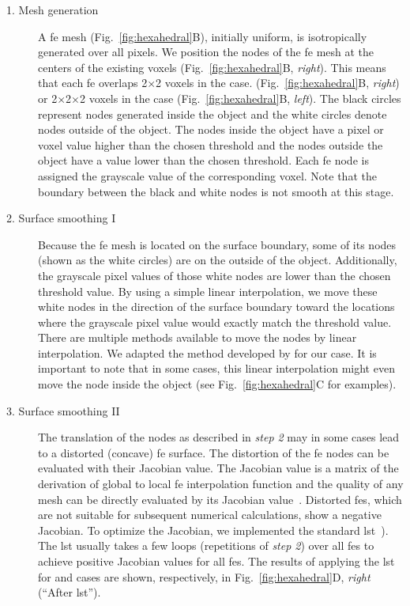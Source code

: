 \begin{description}
	\item[1. Mesh generation] A \ac{fe} mesh (Fig.~\ref{fig:hexahedral}B), initially uniform, is isotropically generated over all pixels. We position the nodes of the \ac{fe} mesh at the centers of the existing voxels (Fig.~\ref{fig:hexahedral}B, \textit{right}). This means that each \ac{fe} overlaps 2$\times$2 voxels in the \twod case. (Fig.~\ref{fig:hexahedral}B, \textit{right}) or 2$\times$2$\times$2 voxels in the \threed case (Fig.~\ref{fig:hexahedral}B, \textit{left}). The black circles represent nodes generated inside the object and the white circles denote nodes outside of the object. The nodes inside the object have a pixel or voxel value higher than the chosen threshold and the nodes outside the object have a value lower than the chosen threshold. Each \ac{fe} node is assigned the grayscale value of the corresponding voxel. Note that the boundary between the black and white nodes is not smooth at this stage.
	\item[2. Surface smoothing I] Because the \ac{fe} mesh is located on the surface boundary, some of its nodes (shown as the white circles) are on the outside of the object. Additionally, the grayscale pixel values of those white nodes are lower than the chosen threshold value. By using a simple linear interpolation, we move these white nodes in the direction of the surface boundary toward the locations where the grayscale pixel value would exactly match the threshold value. There are multiple methods available to move the nodes by linear interpolation. We adapted the method developed by \citet{Schneiders1996} for our \threed case. It is important to note that in some cases, this linear interpolation might even move the node inside the object (see Fig.~\ref{fig:hexahedral}C for examples).
	\item[3. Surface smoothing II] The translation of the nodes as described in \textit{step 2} may in some cases lead to a distorted (concave) \ac{fe} surface. The distortion of the \ac{fe} nodes can be evaluated with their Jacobian value. The Jacobian value is a matrix of the derivation of global to local \ac{fe} interpolation function and the quality of any mesh can be directly evaluated by its Jacobian value~\cite{Bathe1995}. Distorted \acp{fe}, which are not suitable for subsequent numerical calculations, show a negative Jacobian. To optimize the Jacobian, we implemented the standard \ac{lst}~\cite{Freitag2000}). The \ac{lst} usually takes a few loops (repetitions of \textit{step 2}) over all \acp{fe} to achieve positive Jacobian values for all \acp{fe}. The results of applying the \ac{lst} for \threed and \twod cases are shown, respectively, in Fig.~\ref{fig:hexahedral}D, \textit{right} (``After \ac{lst}'').
\end{description}
